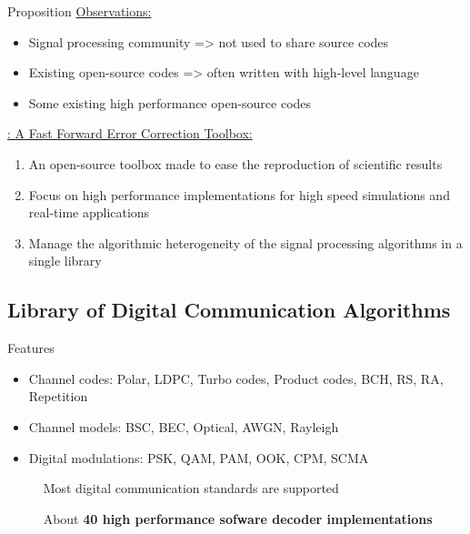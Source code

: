 \begin{frame}{Proposition}
  \vfill
  \underline{Observations:}

  \vspace{0.2cm}
  \begin{itemize}
    \item Signal processing community => not used to share source codes
    \item Existing open-source codes => often written with high-level language
    \item Some existing high performance open-source codes
  \end{itemize}

  \vfill
  \pause
  \underline{\AFFECT: A Fast Forward Error Correction Toolbox:}

  \vspace{0.2cm}
  \begin{enumerate}
    \item An \Cxx open-source toolbox made to ease the reproduction of scientific results
    \pause
    \item Focus on high performance implementations for high speed simulations and real-time applications
    \pause
    \item Manage the algorithmic heterogeneity of the signal processing algorithms in a single library
  \end{enumerate}
  \vfill
\end{frame}

\subsection[Library]{Library of Digital Communication Algorithms}

\begin{frame}{Features}
  \vfill
  \begin{itemize}
    \item Channel codes: Polar, LDPC, Turbo codes, Product codes, BCH, RS, RA, Repetition
    \vspace{0.3cm}
    \item Channel models: BSC, BEC, Optical, AWGN, Rayleigh
    \vspace{0.3cm}
    \item Digital modulations: PSK, QAM, PAM, OOK, CPM, SCMA
  \end{itemize}
  \vfill
  \pause

  \vspace*{.5em}
  ~~~~~{\color{bleuUni}\Large\MVRightarrow} Most digital communication standards are supported

  \vspace*{.5em}
  ~~~~~{\color{bleuUni}\Large\MVRightarrow} About \textbf{40 high performance sofware decoder implementations}
  \vfill
\end{frame}

